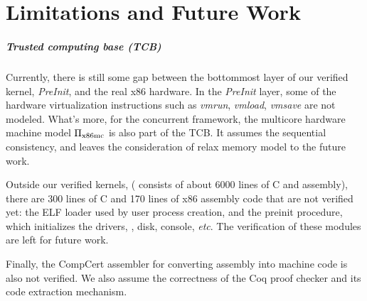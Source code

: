 \chapter{Limitations and Future Work}
\label{chap-limits}


\paragraph{Trusted computing base (TCB)}
Currently, there is still some gap between the bottommost layer of our
verified kernel, {\it PreInit}, and the real x86 hardware.
In the {\it PreInit} layer, some of the hardware virtualization
instructions such as {\it vmrun}, {\it vmload}, {\it vmsave}
are not modeled. 
What's more,
for the concurrent framework,
the multicore hardware machine model $\Pi_{\text{x86mc}}$
is also part of the TCB.
It assumes the sequential consistency,
and leaves the consideration of relax memory model
to the future work.



Outside our verified kernels,
(\mCTOShyper{} consists of about 6000 lines of C and assembly), there
are 300 lines of C and 170 lines of x86 assembly code that are not
verified yet: the ELF loader used by user
process creation,
and the preinit procedure, which initializes the drivers, \eg,
disk, console, {\it etc}.
The verification of these modules are
left for future work. 

Finally, the CompCert assembler for converting assembly into machine
code is also not verified. We also assume the correctness of the Coq
proof checker and its code extraction mechanism.

